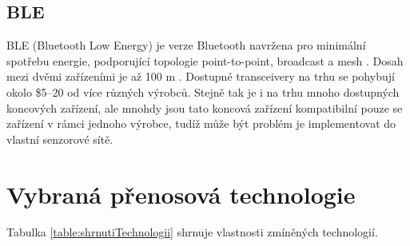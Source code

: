 \subsection{BLE}
BLE (Bluetooth Low Energy) je verze Bluetooth navržena pro minimální spotřebu energie, podporující topologie point-to-point, broadcast a mesh \cite{BT_alliance}.
Dosah mezi dvěmi zařízeními je až 100 m \cite{BT_nordic}.
Dostupné transceivery na trhu se pohybují okolo \$5–20 od více různých výrobců. Stejně tak je i na trhu mnoho dostupných koncových zařízení, ale mnohdy jsou tato koncová zařízení kompatibilní pouze se zařízení v rámci jednoho výrobce, tudíž může být problém je implementovat do vlastní senzorové sítě. 






\newpage
\section{Vybraná přenosová technologie}
Tabulka \ref{table:shrnutiTechnologii} shrnuje vlastnosti zmíněných technologií.   


